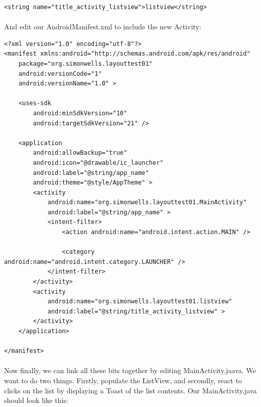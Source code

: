 \documentclass[12pt, a4paper, twoside]{book}
\begin{document}
\begin{lstlisting}
<string name="title_activity_listview">listview</string>
\end{lstlisting}

\paragraph{} And edit our AndroidManifest.xml to include the new Activity:

\begin{lstlisting}
<?xml version="1.0" encoding="utf-8"?>
<manifest xmlns:android="http://schemas.android.com/apk/res/android"
    package="org.simonwells.layouttest01"
    android:versionCode="1"
    android:versionName="1.0" >

    <uses-sdk
        android:minSdkVersion="10"
        android:targetSdkVersion="21" />

    <application
        android:allowBackup="true"
        android:icon="@drawable/ic_launcher"
        android:label="@string/app_name"
        android:theme="@style/AppTheme" >
        <activity
            android:name="org.simonwells.layouttest01.MainActivity"
            android:label="@string/app_name" >
            <intent-filter>
                <action android:name="android.intent.action.MAIN" />

                <category android:name="android.intent.category.LAUNCHER" />
            </intent-filter>
        </activity>
        <activity
            android:name="org.simonwells.layouttest01.listview"
            android:label="@string/title_activity_listview" >
        </activity>
    </application>

</manifest>
\end{lstlisting}

\paragraph{} Now finally, we can link all these bits together by editing MainActivity.jaava. We want to do two things. Firstly, populate the ListView, and secondly, react to clicks on the list by displaying a Toast of the list contents. Our MainActivity.java should look like this:
\end{document}
